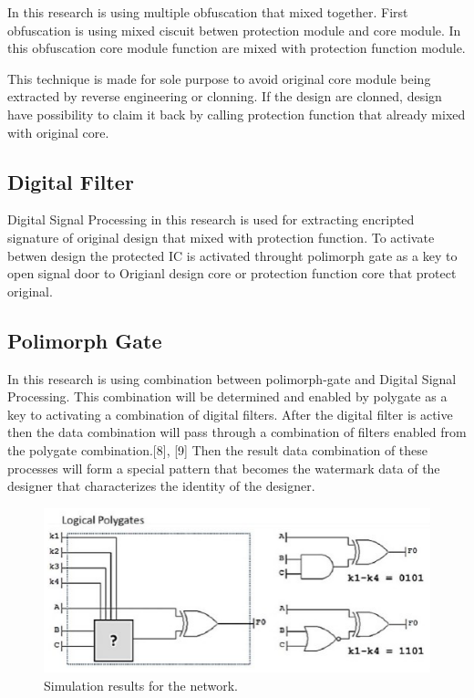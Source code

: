 \documentclass[10pt,journal,compsoc,letterpaper,final]{IEEEtran}
\begin{document}
In this research is using multiple obfuscation that mixed together. First obfuscation is using mixed ciscuit betwen protection module and core module. In this obfuscation core module function are mixed with protection function module.

This technique is made for sole purpose to avoid original core module being extracted by reverse engineering or clonning. If the design are clonned, design have possibility to claim it back by calling protection function that already mixed with original core.

\subsection{Digital Filter}
Digital Signal Processing in this research is used for extracting encripted signature of original design that mixed with protection function. To activate betwen design the protected IC is activated throught polimorph gate as a key to open signal door to Origianl design core or protection function core that protect original.

\subsection{Polimorph Gate}
In this research is using combination between polimorph-gate and Digital Signal Processing. This combination will be determined and enabled by polygate as a key to activating a combination of digital filters. After the digital filter is active then the data combination will pass through a combination of filters enabled from the polygate combination.[8], [9] Then the result data combination of these processes will form a special pattern that becomes the watermark data of the designer that characterizes the identity of the designer.

\begin{figure}
	\centering
	\includegraphics[scale=0.45]{images/polymorphgate}
	\caption{Simulation results for the network.}
	\label{fig_sim}
\end{figure}
\end{document}
